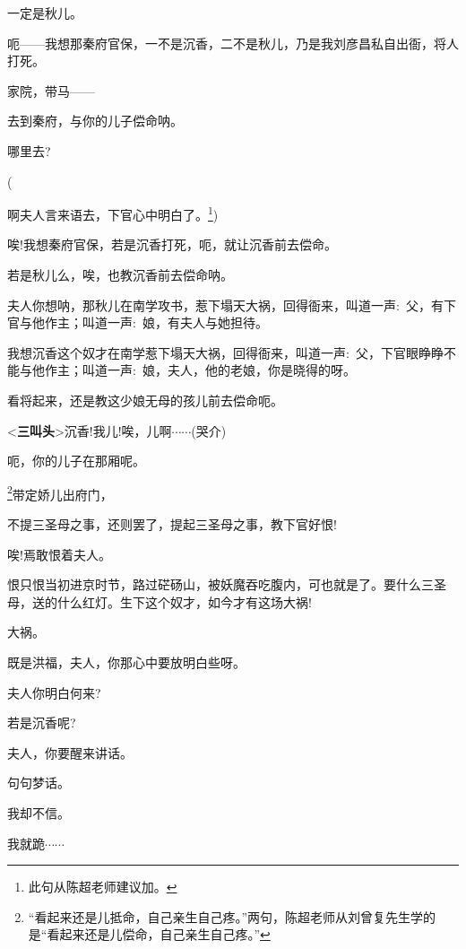 {一定是秋儿。}

{呃------我想那秦府官保，一不是沉香，二不是秋儿，乃是我刘彦昌私自出衙，将人打死。}

{家院，带马------}

{去到秦府，与你的儿子偿命呐。}

{哪里去?}\hspace{10pt}~

{(}\hspace{40pt}~

啊夫人言来语去，下官心中明白了{。}\footnote{此句从陈超老师建议加。}{)}

{唉!我想秦府官保，若是沉香打死，呃，就让沉香前去偿命。}

{若是秋儿么，唉，也教沉香前去偿命呐。}

{夫人你想呐，那秋儿在南学攻书，惹下塌天大祸，回得衙来，叫道一声:~父，有下官与他作主；叫道一声:~娘，有夫人与她担待。}

{我想沉香这个奴才在南学惹下塌天大祸，回得衙来，叫道一声:~父，下官眼睁睁不能与他作主；叫道一声:~娘，夫人，他的老娘，你是晓得的呀。}

{看将起来，还是教这少娘无母的孩儿前去偿命呃。}

{\textless{}{\!\bfseries\akai 三叫头}\!\textgreater{}沉香!我儿!唉，儿啊$\cdots{}\cdots{}$({\hwfs 哭}{\hwfs 介})}

{呃，你的儿子在那厢呢。}

\footnote{{``看起来还是儿抵命，自己亲生自己疼。''两句，}陈超老师从刘曾复先生学的是``{看起来还是儿偿命}，{自己亲生自己疼。}''}{带定娇儿出府门，}


{不提三圣母之事，还则罢了，提起三圣母之事，教下官好恨!}

{唉!焉敢恨着夫人。}

{恨只恨当初进京时节，路过硭砀山，被妖魔吞吃腹内，可也就是了。要什么三圣母，送的什么红灯。生下这个奴才，如今才有这场大祸!}

{大祸。}

{既是洪福，夫人，你那心中要放明白些呀。}

{夫人你明白何来?}

{若是沉香呢?}

{夫人，你要醒来讲话。}

{句句梦话。}

{我却不信。}

{我就跪$\cdots{}\cdots{}$}

